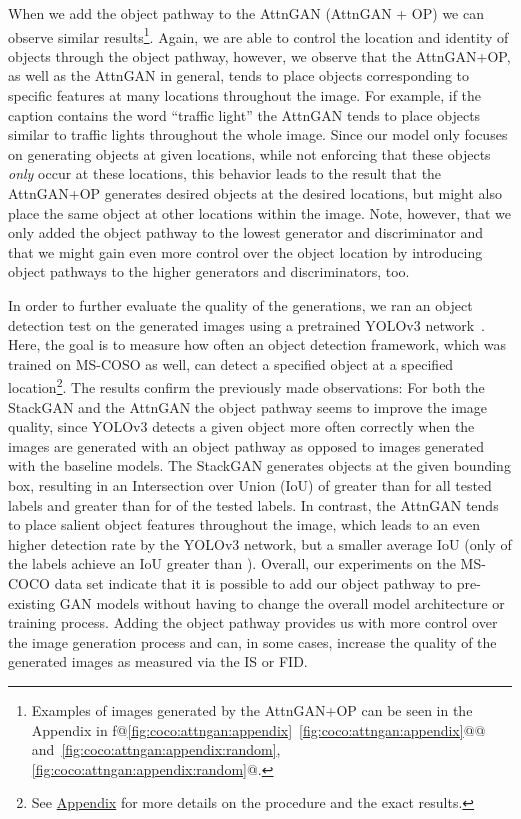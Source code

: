 \documentclass{article} \usepackage{iclr2019_conference,times}
\makeatletter
\newcommand\Autoref[1]{\@first@ref#1,@}
\def\@first@ref#1,#2{\ifx#2@\autoref{#1}\let\@nextref\@gobble \else \@set@refname{#1}\@refname~\ref{#1}\let\@nextref\@next@ref \fi \@nextref#2}
\def\@next@ref#1,#2{\ifx#2@ and~\ref{#1}\let\@nextref\@gobble \else, \ref{#1}\fi \@nextref#2}
\makeatother
\begin{document}
	When we add the object pathway to the AttnGAN (AttnGAN + OP) we can observe similar results\footnote{Examples of images generated by the AttnGAN+OP can be seen in the Appendix in \Autoref{fig:coco:attngan:appendix,fig:coco:attngan:appendix:random}.}.
	Again, we are able to control the location and identity of objects through the object pathway, however, we observe that the AttnGAN+OP, as well as the AttnGAN in general, tends to place objects corresponding to specific features at many locations throughout the image.
	For example, if the caption contains the word ``traffic light'' the AttnGAN tends to place objects similar to traffic lights throughout the whole image.
	Since our model only focuses on generating objects at given locations, while not enforcing that these objects \emph{only} occur at these locations, this behavior leads to the result that the AttnGAN+OP generates desired objects at the desired locations, but might also place the same object at other locations within the image.
	Note, however, that we only added the object pathway to the lowest generator and discriminator and that we might gain even more control over the object location by introducing object pathways to the higher generators and discriminators, too.
	
	In order to further evaluate the quality of the generations, we ran an object detection test on the generated images using a pretrained YOLOv3 network~\citep{redmon2018yolov3}. 
	Here, the goal is to measure how often an object detection framework, which was trained on MS-COSO as well, can detect a specified object at a specified location\footnote{See \hyperref[app:bbox:mscoco:yolo]{Appendix} for more details on the procedure and the exact results.}.
	The results confirm the previously made observations:
	For both the StackGAN and the AttnGAN the object pathway seems to improve the image quality, since YOLOv3 detects a given object more often correctly when the images are generated with an object pathway as opposed to images generated with the baseline models.
	The StackGAN generates objects at the given bounding box, resulting in an Intersection over Union (IoU) of greater than  for all tested labels and greater than  for  of the tested labels. 
	In contrast, the AttnGAN tends to place salient object features throughout the image, which leads to an even higher detection rate by the YOLOv3 network, but a smaller average IoU (only  of the labels achieve an IoU greater than ).
	Overall, our experiments on the MS-COCO data set indicate that it is possible to add our object pathway to pre-existing GAN models without having to change the overall model architecture or training process.
	Adding the object pathway provides us with more control over the image generation process and can, in some cases, increase the quality of the generated images as measured via the IS or FID.
		
\end{document}
